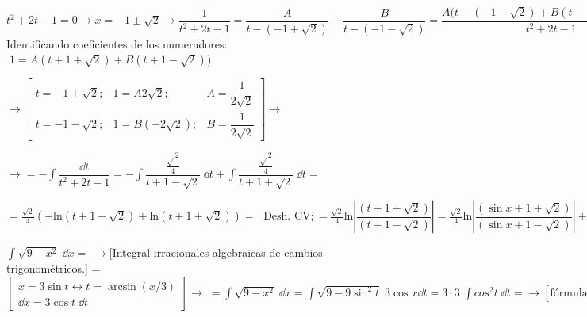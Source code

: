 {\begin{ejem}
	$t^2+2t-1=0 \to x=-1\pm \sqrt{2} \to \dfrac {1}{t^2+2t-1} = \dfrac {A}{t-(-1+\sqrt
	{2})}+\dfrac {B}{t-(-1-\sqrt{2})}=\dfrac {A(t-(-1-\sqrt{2})+B(t-(-1+\sqrt{2}))}{t^2+2t-1} \to $ Identificando coeficientes de los numeradores: $\; 1= A(t+1+\sqrt{2})+B(t+1-\sqrt{2}))$
	
	$ \to \left[ \begin{matrix} t=-1+\sqrt{2}; & 1=A 2\sqrt{2};  & A= \dfrac {1}{2\sqrt{2}}\\
	 t=-1-\sqrt{2}; & 1= B(-2\sqrt{2}); &  B= \dfrac {1}{2\sqrt{2} } \end{matrix} \right] \to $
	 
	 
	$ \to =\displaystyle - \int \dfrac {\dd t}{t^2+2t-1}= - \int \dfrac { \frac { \sqrt{}2 }{ 4 } }{  t+1-\sqrt{2} } \; \dd t  + \int \dfrac { \frac { \sqrt{}2 }{ 4 } }{  t+1+\sqrt{2} } \; \dd t  =\;  $
	
	$= \displaystyle \frac {\sqrt{2}}{4} \left( -\mathrm{ln} (t+1-\sqrt{2}) + \mathrm{ln} (t+1+\sqrt{2}) \right)=\; \text { Desh. CV}; = \displaystyle \frac {\sqrt{2}}{4} \mathrm {ln}\left| \dfrac  {(t+1+\sqrt{2})}  {(t+1-\sqrt{2})} \right| =\frac {\sqrt{2}}{4} \mathrm {ln}\left| \dfrac  {(\sin x +1+\sqrt{2})}  {(\sin x+1-\sqrt{2})} \right| + \mathcal C $	
\end{ejem}


\begin{ejem}
$\displaystyle \int \sqrt{9-x^2} \; \dd x = \; \to $[Integral  irracionales algebraicas de cambios trigonométricos.] =$ \displaystyle\left[ \begin{matrix} x=3\sin t \leftrightarrow t=\arcsin (x/3) \\
\dd x = 3 \cos t  \;  \dd t \end{matrix} \right] \to\;  =  \int \sqrt{9-x^2} \; \dd x =\int \sqrt{9-9\sin^2 t} \; 3 \cos x \dd t = 3 \cdot 3 \; \int cos^2 t \; \dd t = \to  \left[ \text{fórmula reducción: } \;  \cos^2 \alpha = \frac 1 2 (1 + \cos (2\alpha) \right] \to = 9\; \frac 1 2  \int  (1 + \cos 2t) \; \dd t = \frac 9 2 \left( t+\frac 1 2 \sin (2t)   \right) = \frac 9 2 t + \frac 9 4 (2 \sin t \; cos t) =  \frac 9 2 t + \frac 9 4 (2 \sin t \; \sqrt{1-sin^2 t}) = \; \text { [Desh. CV  ] }\; =  \frac 9 2 \; \arcsin (x/3) + \frac 9 4 (2 \sin (\arcsin (x/3))  \; \sqrt{1-sin^2 (\arcsin (x/3) )})  + \mathcal C= \frac 9 2 \; \arcsin (x/3) +\frac 9 2 \; \frac x 3 \; \sqrt{1-\dfrac {x^2}{9}} + \mathcal C =  \frac 9 2 \; \arcsin (x/3) + \frac 1 2 x\; \sqrt{9-x^2} + \mathcal C$

\end{ejem}

}
